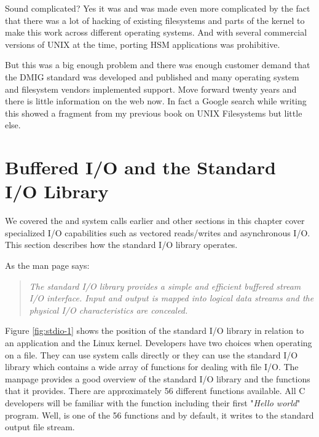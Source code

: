Sound complicated? Yes it was and was made even more complicated by the fact that there was a lot of hacking of existing filesystems and parts of the kernel to make this work across different operating systems. And with several commercial versions of UNIX at the time, porting HSM applications was prohibitive. 

But this was a big enough problem and there was enough customer demand that the DMIG standard was developed and published and many operating system and filesystem vendors implemented support. Move forward twenty years and there is little information on the web now. In fact a Google search while writing this showed a fragment from my previous book on UNIX Filesystems but little else.


\section{Buffered I/O and the Standard I/O Library}\label{stdio}

We covered the  and  system calls earlier and other sections in this chapter cover specialized I/O capabilities such as vectored reads/writes and asynchronous I/O. This section describes how the standard I/O library operates.

As the  man page says:

\begin{quote}
\textit{The  standard  I/O  library  provides  a  simple and efficient buffered stream I/O interface.  Input and output is  mapped  into  logical  data streams  and the physical I/O characteristics are concealed.}
\end{quote}

\noindent
Figure \ref{fig:stdio-1} shows the position of the standard I/O library in relation to an application and the Linux kernel. Developers have two choices when operating on a file. They can use system calls directly or they can use the standard I/O library which contains a wide array of functions for dealing with file I/O. The  manpage provides a good overview of the standard I/O library and the functions that it provides. There are approximately 56 different functions available. All C developers will be familiar with the  function including their first "\textit{Hello world}" program. Well,  is one of the 56 functions and by default, it writes to the standard output file stream.

